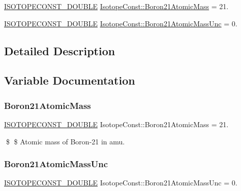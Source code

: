 \begin{DoxyCompactItemize}
\item 
\mbox{\hyperlink{group___isotope_const-_macros_ga8f45a7272ce02c0b4c65c44636ed719a}{I\+S\+O\+T\+O\+P\+E\+C\+O\+N\+S\+T\+\_\+\+D\+O\+U\+B\+LE}} \mbox{\hyperlink{group___isotope_const-_boron-_b21_ga60b2452ce3d9cb39cca09d9d964be0b0}{Isotope\+Const\+::\+Boron21\+Atomic\+Mass}} = 21.
\item 
\mbox{\hyperlink{group___isotope_const-_macros_ga8f45a7272ce02c0b4c65c44636ed719a}{I\+S\+O\+T\+O\+P\+E\+C\+O\+N\+S\+T\+\_\+\+D\+O\+U\+B\+LE}} \mbox{\hyperlink{group___isotope_const-_boron-_b21_gaa8913f58e6fa2894788f7333f2b82777}{Isotope\+Const\+::\+Boron21\+Atomic\+Mass\+Unc}} = 0.
\end{DoxyCompactItemize}


\subsection{Detailed Description}


\subsection{Variable Documentation}
\mbox{\label{group___isotope_const-_boron-_b21_ga60b2452ce3d9cb39cca09d9d964be0b0}} 
\subsubsection{\texorpdfstring{Boron21\+Atomic\+Mass}{Boron21AtomicMass}}
{\footnotesize\ttfamily \mbox{\hyperlink{group___isotope_const-_macros_ga8f45a7272ce02c0b4c65c44636ed719a}{I\+S\+O\+T\+O\+P\+E\+C\+O\+N\+S\+T\+\_\+\+D\+O\+U\+B\+LE}} Isotope\+Const\+::\+Boron21\+Atomic\+Mass = 21.}

\$ \$ Atomic mass of Boron-\/21 in amu. \mbox{\label{group___isotope_const-_boron-_b21_gaa8913f58e6fa2894788f7333f2b82777}} 
\subsubsection{\texorpdfstring{Boron21\+Atomic\+Mass\+Unc}{Boron21AtomicMassUnc}}
{\footnotesize\ttfamily \mbox{\hyperlink{group___isotope_const-_macros_ga8f45a7272ce02c0b4c65c44636ed719a}{I\+S\+O\+T\+O\+P\+E\+C\+O\+N\+S\+T\+\_\+\+D\+O\+U\+B\+LE}} Isotope\+Const\+::\+Boron21\+Atomic\+Mass\+Unc = 0.}

